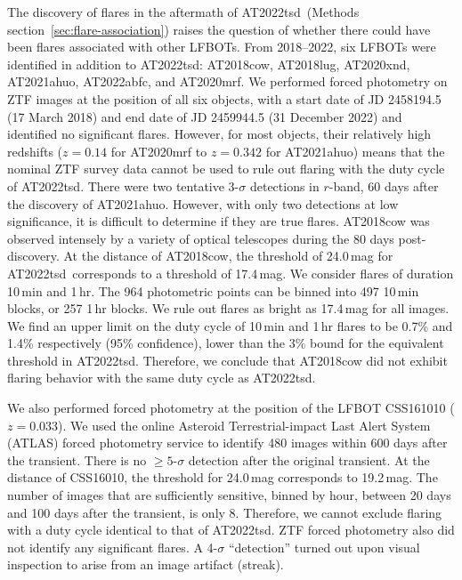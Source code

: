 \documentclass{nature_plusfigure}
\newcommand{\at}{AT2022tsd}
\begin{document}
\begin{methods}
The discovery of flares in the aftermath of \at\ (Methods section~\ref{sec:flare-association}) raises the question of whether there could have been flares associated with other LFBOTs. 
From 2018--2022, six LFBOTs were identified in addition to \at: AT2018cow\cite{Prentice2018}, AT2018lug\cite{Ho2020_Koala}, AT2020xnd\cite{Perley2021}, AT2021ahuo, AT2022abfc\cite{Ho2022_AT2022abfc},  
and AT2020mrf\cite{Yao2022}. 
We performed forced photometry on ZTF images at the position of all six objects, with a start date of JD 2458194.5 (17 March 2018) and end date of JD 2459944.5 (31 December 2022) and identified no significant flares.
However, for most objects, their relatively high redshifts ($z=0.14$ for AT2020mrf\cite{Yao2022} to $z=0.342$ for AT2021ahuo) means that the nominal ZTF survey data cannot be used to rule out flaring with the duty cycle of \at.
There were two tentative 3-$\sigma$ detections in $r$-band, 60 days after the discovery of AT2021ahuo. However, with only two detections at low significance, it is difficult to determine if they are true flares.
AT2018cow was observed intensely by a variety of optical telescopes during the 80 days post-discovery\cite{Perley2019}. At the distance of AT2018cow, the threshold of 24.0\,mag for \at\ corresponds to a threshold of 17.4\,mag. We consider flares of duration 10\,min and 1\,hr. The 964 photometric points can be binned into 497 10\,min blocks, or 257 1\,hr blocks. We rule out flares as bright as 17.4\,mag for all images. We find an upper limit on the duty cycle of 10\,min and 1\,hr flares to be 0.7\% and 1.4\% respectively (95\% confidence), lower than the 3\% bound for the equivalent threshold in \at. Therefore, we conclude that AT2018cow did not exhibit flaring behavior with the same duty cycle as \at.

We also performed forced photometry at the position of the LFBOT CSS161010\cite{Coppejans2020} ($z=0.033$). 
We used the online Asteroid Terrestrial-impact Last Alert System (ATLAS)\cite{Tonry2018,Smith2020} forced photometry service\cite{Shingles2021} to identify 480 images within 600 days after the transient. There is no $\geq5$-$\sigma$ detection after the original transient. At the distance of CSS16010, the threshold for 24.0\,mag corresponds to 19.2\,mag. The number of images that are sufficiently sensitive, binned by hour, between 20 days and 100 days after the transient, is only 8. Therefore, we cannot exclude flaring with a duty cycle identical to that of \at.
ZTF forced photometry also did not identify any significant flares. A 4-$\sigma$ ``detection'' turned out upon visual inspection to arise from an image artifact (streak). 


\end{methods}
\end{document}
